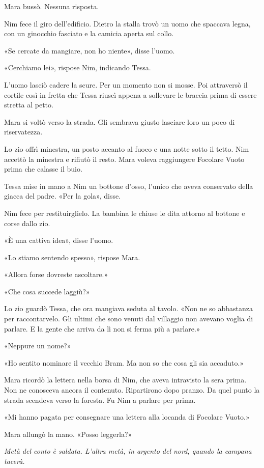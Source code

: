 \documentclass[10pt,a4paper]{article}
\begin{document}
Mara bussò. Nessuna risposta.

Nim fece il giro dell'edificio. Dietro la stalla trovò un uomo che spaccava legna, con un ginocchio fasciato e la camicia aperta sul collo.

«Se cercate da mangiare, non ho niente», disse l'uomo.

«Cerchiamo lei», rispose Nim, indicando Tessa.

L'uomo lasciò cadere la scure. Per un momento non si mosse. Poi attraversò il cortile così in fretta che Tessa riuscì appena a sollevare le braccia prima di essere stretta al petto.

Mara si voltò verso la strada. Gli sembrava giusto lasciare loro un poco di riservatezza.

Lo zio offrì minestra, un posto accanto al fuoco e una notte sotto il tetto. Nim accettò la minestra e rifiutò il resto. Mara voleva raggiungere Focolare Vuoto prima che calasse il buio.

Tessa mise in mano a Nim un bottone d'osso, l'unico che aveva conservato della giacca del padre. «Per la gola», disse.

Nim fece per restituirglielo. La bambina le chiuse le dita attorno al bottone e corse dallo zio.

«È una cattiva idea», disse l'uomo.

«Lo stiamo sentendo spesso», rispose Mara.

«Allora forse dovreste ascoltare.»

«Che cosa succede laggiù?»

Lo zio guardò Tessa, che ora mangiava seduta al tavolo. «Non ne so abbastanza per raccontarvelo. Gli ultimi che sono venuti dal villaggio non avevano voglia di parlare. E la gente che arriva da lì non si ferma più a parlare.»

«Neppure un nome?»

«Ho sentito nominare il vecchio Bram. Ma non so che cosa gli sia accaduto.»

Mara ricordò la lettera nella borsa di Nim, che aveva intravisto la sera prima. Non ne conosceva ancora il contenuto.
Ripartirono dopo pranzo. Da quel punto la strada scendeva verso la foresta. Fu Nim a parlare per prima.

«Mi hanno pagata per consegnare una lettera alla locanda di Focolare Vuoto.»

Mara allungò la mano. «Posso leggerla?»

\emph{Metà del conto è saldata. L'altra metà, in argento del nord, quando la campana tacerà.}
\end{document}
